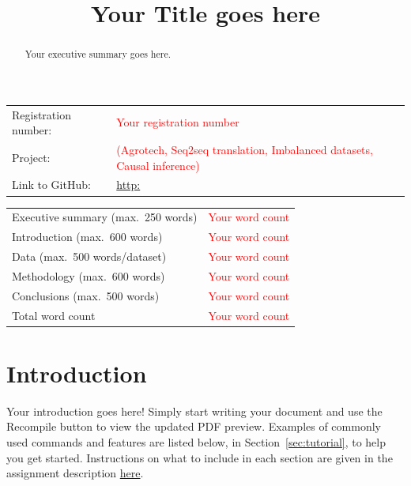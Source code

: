 \documentclass{article}
\title{Your Title goes here}
\begin{document}
\maketitle

\begin{table}[h]
    \centering
    \begin{tabular}{ll}
        Registration number: & \textcolor{red}{Your registration number}\\
        Project: & \textcolor{red}{(Agrotech, Seq2seq translation, Imbalanced datasets, Causal inference)}\\
        Link to GitHub: & \url{http:}\\
    \end{tabular}
\end{table}



\begin{table}[h]
    \centering
    \begin{tabular}{lc}
        Executive summary (max.\ 250 words) & \textcolor{red}{Your word count}\\
        Introduction (max.\ 600 words) & \textcolor{red}{Your word count}\\
        Data (max.\ 500 words/dataset) & \textcolor{red}{Your word count}\\
        Methodology (max.\ 600 words) & \textcolor{red}{Your word count}\\
        Conclusions (max.\ 500 words) & \textcolor{red}{Your word count}\\
        \hline
        Total word count & \textcolor{red}{Your word count}\\
    \end{tabular}
\end{table}

\tableofcontents

\clearpage



\begin{abstract}
Your executive summary goes here.
\end{abstract}


\section{Introduction}

Your introduction goes here! Simply start writing your document and use the Recompile button to view the updated PDF preview. Examples of commonly used commands and features are listed below, in Section~\ref{sec:tutorial}, to help you get started. Instructions on what to include in each section are given in the assignment description \href{https://moodle.essex.ac.uk/draftfile.php/196919/user/draft/666046553/2021_CE888_Assignment_1.pdf}{here}.
\end{document}
